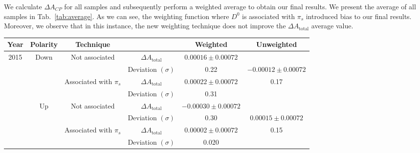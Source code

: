 \documentclass{article}
\begin{document}
        We calculate $\Delta A_{CP}$ for all samples and subsequently perform a weighted average to obtain our final results.
        We present the average of all samples in Tab.~\ref{tab:average}.
        As we can see, the weighting function where $D^0$ is associated with $\pi_s$ introduced bias to our final results.
        Moreover, we observe that in this instance, the new weighting technique does not improve the $\Delta A_\text{total}$ average value.

        \begin{center}
                \begin{tabular}{c|c|c|c|c|c}
                        Year & Polarity & Technique & & Weighted & Unweighted\\
                        \hline\hline
                        \multirow{8}{*}{2015} & \multirow{4}{*}{Down} & \multirow{2}{*}{Not associated} & $\Delta A_\text{total}$ & $0.00016\pm 0.00072$& \\
                        & & & Deviation $(\sigma)$ & 0.22& $-0.00012\pm 0.00072$\\
                        \cline{3-5}
                        & & \multirow{2}{*}{Associated with $\pi_s$} & $\Delta A_\text{total}$ & $0.00022\pm 0.00072$& 0.17\\
                        & & & Deviation $(\sigma)$ & 0.31& \\
                        \cline{2-6}
                        & \multirow{4}{*}{Up} & \multirow{2}{*}{Not associated} & $\Delta A_\text{total}$ & $-0.00030\pm 0.00072$& \\
                        & & & Deviation $(\sigma)$ & 0.30& $0.00015\pm 0.00072$\\
                        \cline{3-5}
                        & & \multirow{2}{*}{Associated with $\pi_s$} & $\Delta A_\text{total}$ & $0.00002\pm 0.00072$& 0.15\\
                        & & & Deviation $(\sigma)$ & 0.020& \\
                        \hline


\end{tabular}
\end{center}
\end{document}
